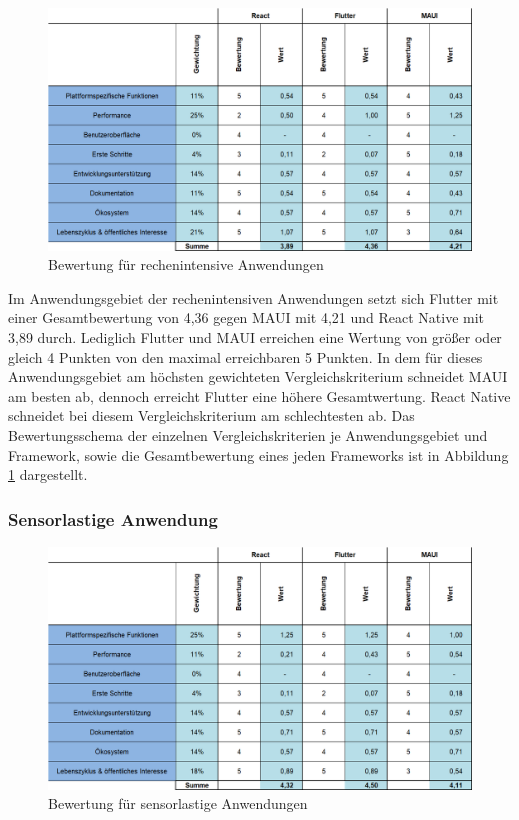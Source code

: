 \documentclass[]{lni}
\begin{document}
\begin{figure}[ht]
	\centering
	\includegraphics[width=0.8\linewidth]{images/AnalyseRechenintensiv.png}
	\caption{Bewertung für rechenintensive Anwendungen}
	\label{fig:analRechen}
\end{figure}

Im Anwendungsgebiet der rechenintensiven Anwendungen setzt sich Flutter mit einer Gesamtbewertung von 4,36 gegen MAUI mit 4,21 und React Native mit 3,89 durch. Lediglich Flutter und MAUI erreichen eine Wertung von größer oder gleich 4 Punkten von den maximal erreichbaren 5 Punkten. In dem für dieses Anwendungsgebiet am höchsten gewichteten Vergleichskriterium schneidet MAUI am besten ab, dennoch erreicht Flutter eine höhere Gesamtwertung. React Native schneidet bei diesem Vergleichskriterium am schlechtesten ab. Das Bewertungsschema der einzelnen Vergleichskriterien je Anwendungsgebiet und Framework, sowie die Gesamtbewertung eines jeden Frameworks ist in Abbildung \ref{fig:analRechen} dargestellt.

\subsubsection{Sensorlastige Anwendung}

\begin{figure}[ht]
	\centering
	\includegraphics[width=0.8\linewidth]{images/AnalyseSensorlastig.png}
	\caption{Bewertung für sensorlastige Anwendungen}
	\label{fig:analSensor}
\end{figure}
\end{document}
